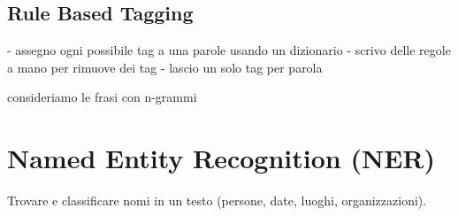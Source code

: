 \subsection*{Rule Based Tagging}
- assegno ogni possibile tag a una parole usando un dizionario
- scrivo delle regole a mano per rimuove dei tag
- lascio un solo tag per parola

consideriamo le frasi con n-grammi

\section{Named Entity Recognition (NER)}
Trovare e classificare nomi in un testo (persone, date, luoghi, organizzazioni).
